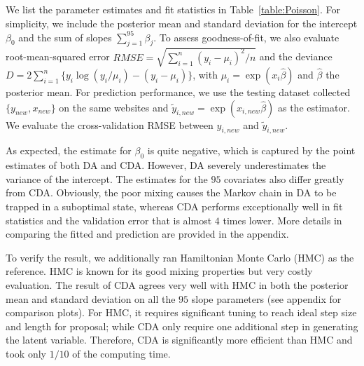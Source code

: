 \documentclass[10pt]{article}
\begin{document}
We list the parameter estimates and fit statistics in Table~\ref{table:Poisson}. For simplicity, we include the posterior mean and standard deviation for the intercept $\beta_0$ and the sum of slopes $\sum_{j=1}^{95} \beta_j$. To assess goodness-of-fit, we also evaluate root-mean-squared error $RMSE= \sqrt{ \sum_{i=1}^n  (y_i-\mu_i)^2/n}$ and the deviance $D=2\sum_{i=1}^n \{ y_i \log(y_i/\mu_i) -(y_i-\mu_i)\}$, with $\mu_i=\exp( x_i{\hat\beta})$ and ${\hat\beta}$ the posterior mean. For prediction performance, we use the testing dataset collected $\{ y_{new},  x_{new}\}$ on the same websites and $\tilde y_{i,new}=\exp( x_{i,new}{\hat\beta})$ as the estimator. We evaluate the cross-validation RMSE between $y_{i,new}$ and $\tilde y_{i,new}$.

As expected, the estimate for $\beta_0$ is quite negative, which is captured by the point estimates of both DA and CDA. However, DA severely underestimates the variance of the intercept. The estimates for the $95$ covariates also differ greatly from CDA. Obviously, the poor mixing causes the Markov chain in DA to be trapped in a suboptimal state, whereas CDA performs exceptionally well in fit statistics and the validation error that is almost $4$ times lower. More details in comparing the fitted and prediction are provided in the appendix.

To verify the result, we additionally ran Hamiltonian Monte Carlo (HMC) as the reference. HMC is known for its good mixing properties but very costly evaluation. The result of CDA agrees very well with HMC in both the posterior mean and standard deviation on all the $95$ slope parameters (see appendix for comparison plots). For HMC, it requires significant tuning to reach ideal step size and length for proposal; while CDA only require one additional  step in generating the latent variable. Therefore, CDA is significantly more efficient than HMC and took only $1/10$ of the computing time.
\end{document}
